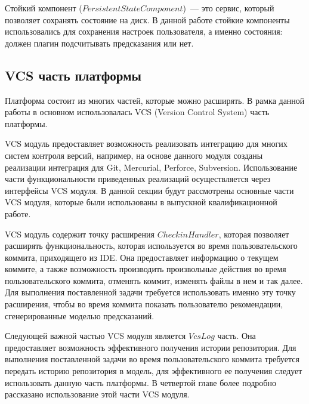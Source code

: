 Стойкий компонент ($PersistentStateComponent$)~--- это сервис, который позволяет сохранять состояние на диск. В данной работе стойкие компоненты использовались для сохранения настроек пользователя, а именно состояния: должен плагин подсчитывать предсказания или нет.
    \subsection{VCS часть платформы}
Платформа состоит из многих частей, которые можно расширять. В рамка данной работы в основном использовалась VCS (Version Control System) часть платформы.

VCS модуль предоставляет возможность реализовать интеграцию для многих систем контроля версий, например, на основе данного модуля созданы реализации интеграция для Git, Mercurial, Perforce, Subversion. Использование части функциональности приведенных реализаций осуществляется через интерфейсы VCS модуля. В данной секции будут рассмотрены основные части VCS модуля, которые были использованы в выпускной квалификационной работе.

VCS модуль содержит точку расширения $CheckinHandler$, которая позволяет расширять функциональность, которая используется во время пользовательского коммита, приходящего из IDE. Она предоставляет информацию о текущем коммите, а также возможность производить произвольные действия во время пользовательского коммита, отменять коммит, изменять файлы в нем и так далее. Для выполнения поставленной задачи требуется использовать именно эту точку расширения, чтобы во время коммита показать пользователю рекомендации, сгенерированные моделью предсказаний.

Следующей важной частью VCS модуля является $VcsLog$ часть. Она предоставляет возможность эффективного получения истории репозитория. Для выполнения поставленной задачи во время пользовательского коммита требуется передать историю репозитория в модель, для эффективного ее получения следует использовать данную часть платформы. В четвертой главе более подробно рассказано использование этой части VCS модуля.
